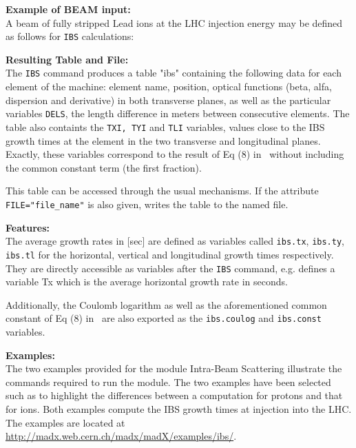 \textbf{Example of BEAM input:}\\
A beam of fully stripped Lead ions at the LHC injection energy may be
defined as follows for \texttt{IBS} calculations: 


\textbf{Resulting Table and File:} \\
The \texttt{IBS} command produces a table "ibs" containing the following
data for each element of the machine: element name, position, optical functions
(beta, alfa, dispersion and derivative) in both transverse planes, as
well as the particular variables \texttt{DELS}, the length difference in
meters between consecutive elements. The table also containts the \texttt{TXI, TYI}
and \texttt{TLI} variables, values close to the IBS growth times at the element in
the two transverse and longitudinal planes. Exactly, these variables correspond to
the result of Eq (8) in~\cite{antoniou-zimmermann2012} without including the common
constant term (the first fraction).

This table can be accessed through the usual mechanisms. If the
attribute \texttt{FILE="file\_name"} is also given, \madx writes the
table to the named file.  


\textbf{Features:} \\
The average growth rates in [sec] are defined as variables called
\texttt{ibs.tx}, \texttt{ibs.ty}, \texttt{ibs.tl} for the horizontal,
vertical and longitudinal growth times respectively. They are directly
accessible as variables after the \texttt{IBS} command, e.g.
defines a variable Tx which is the average horizontal growth rate in seconds.

Additionally, the Coulomb logarithm as well as the aforementioned common
constant of Eq (8) in~\cite{antoniou-zimmermann2012} are also exported as
the \texttt{ibs.coulog} and \texttt{ibs.const} variables.


\textbf{Examples:} \\
The two examples provided for the module Intra-Beam Scattering
illustrate the commands required to run the module. The two examples
have been selected such as to highlight the differences between a
computation for protons and that for ions. Both examples compute the IBS
growth times at injection into the LHC.\\
The examples are located at
\href{http://madx.web.cern.ch/madx/madX/examples/ibs/}{http://madx.web.cern.ch/madx/madX/examples/ibs/}. 


